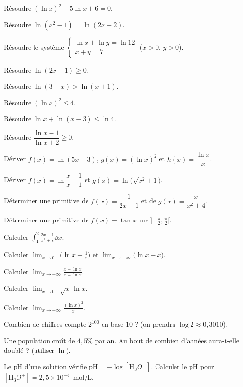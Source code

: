 \exo{} Résoudre $(\ln x)^{2}-5\ln x+6=0$.

\exo{} Résoudre $\ln(x^{2}-1)=\ln(2x+2)$.

\exo{} Résoudre le système $\begin{cases}\ln x+\ln y=\ln 12\\ x+y=7\end{cases}$
($x>0$, $y>0$).

\exo{} Résoudre $\ln(2x-1)\ge0$.

\exo{} Résoudre $\ln(3-x)>\ln(x+1)$.

\exo{} Résoudre $(\ln x)^{2}\le 4$.

\exo{} Résoudre $\ln x+\ln(x-3)\le\ln 4$.

\exo{} Résoudre $\dfrac{\ln x-1}{\ln x+2}\ge0$.

\exo{} Dériver $f(x)=\ln(5x-3)$, $g(x)=(\ln x)^{2}$ et $h(x)=\dfrac{\ln x}{x}$.

\exo{} Dériver $f(x)=\ln\dfrac{x+1}{x-1}$ et $g(x)=\ln\big(\sqrt{x^{2}+1}\big)$.

\exo{} Déterminer une primitive de $f(x)=\dfrac{1}{2x+1}$ et de
$g(x)=\dfrac{x}{x^{2}+4}$.

\exo{} Déterminer une primitive de $f(x)=\tan x$ sur $\big]{-\tfrac\pi2},\tfrac\pi2\big[$.

\exo{} Calculer $\displaystyle\int_{1}^{2}\frac{2x+1}{x^{2}+x}\dd x$.

\exo{} Calculer $\displaystyle\lim_{x\to0^{+}}\big(\ln x-\tfrac1x\big)$ et
$\displaystyle\lim_{x\to+\infty}\big(\ln x-x\big)$.

\exo{} Calculer $\displaystyle\lim_{x\to+\infty}\frac{x+\ln x}{x-\ln x}$.

\exo{} Calculer $\displaystyle\lim_{x\to0^{+}}\sqrt x\,\ln x$.

\exo{} Calculer $\displaystyle\lim_{x\to+\infty}\frac{(\ln x)^{2}}{x}$.

\exo{} Combien de chiffres compte $2^{100}$ en base $10$ ? (on prendra
$\log 2\approx0{,}3010$).

\exo{} Une population croît de $4{,}5\%$ par an. Au bout de combien d'années
aura-t-elle doublé ? (utiliser $\ln$).

\exo{} Le pH d'une solution vérifie $\mathrm{pH}=-\log[\mathrm H_3O^+]$.
Calculer le pH pour $[\mathrm H_3O^+]=2{,}5\times10^{-4}$~mol/L.


